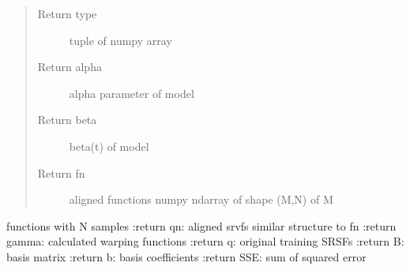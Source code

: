 \documentclass[letterpaper,10pt,english]{sphinxmanual}
\begin{document}
\begin{fulllineitems}
\begin{quote}
\begin{description}
\begin{itemize}
\end{itemize}

\item[{Return type}] \leavevmode
tuple of numpy array

\item[{Return alpha}] \leavevmode
alpha parameter of model

\item[{Return beta}] \leavevmode
beta(t) of model

\item[{Return fn}] \leavevmode
aligned functions \sphinxhyphen{} numpy ndarray of shape (M,N) of M

\end{description}\end{quote}

functions with N samples
:return qn: aligned srvfs \sphinxhyphen{} similar structure to fn
:return gamma: calculated warping functions
:return q: original training SRSFs
:return B: basis matrix
:return b: basis coefficients
:return SSE: sum of squared error

\end{fulllineitems}

\end{document}

